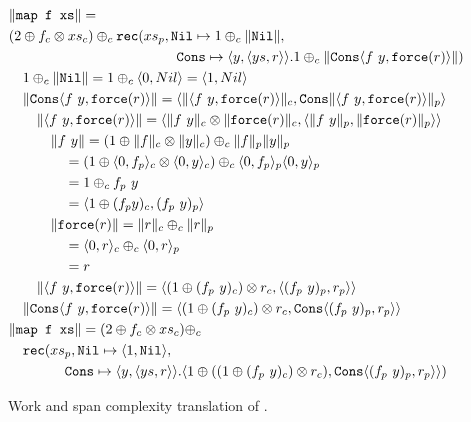 \begin{figure}
  \label{fig:ws_map_complexity_translation}
  \caption{Work and span complexity translation of .}
  \[\begin{split}
    &\|\texttt{map f xs}\| = \\
    &  (2 \oplus f_c \otimes xs_c) \oplus_c \texttt{rec}(xs_p, \texttt{Nil}\mapsto 1 \oplus_c \|\texttt{Nil}\|, \\
    &\qquad\quad\quad\quad\qquad\quad\quad\quad\qquad \texttt{Cons} \mapsto \langle y, \langle ys, r \rangle \rangle. 1 \oplus_c \|\texttt{Cons}\langle f\ y, \texttt{force}(r)\rangle \|) \\
    &\quad 1 \oplus_c \|\texttt{Nil}\| = 1 \oplus_c \langle 0, Nil \rangle = \langle 1, Nil \rangle \\
    &\quad\|\texttt{Cons}\langle f\ y, \texttt{force}(r)\rangle \| = \langle \|\langle f\ y, \texttt{force}(r)\rangle\|_c, \texttt{Cons} \| \langle f\ y, \texttt{force}(r)\rangle \|_p\rangle \\
    &\qquad \|\langle f\ y, \texttt{force}(r)\rangle\| = \langle \|f\ y\|_c \otimes \|\texttt{force}(r)\|_c, \langle \|f\ y\|_p, \|\texttt{force}(r)\|_p\rangle\rangle \\
    &\qquad\quad \|f\ y\| = (1 \oplus \|f\|_c \otimes \|y\|_c) \oplus_c \|f\|_p \|y\|_p \\
    &\qquad\quad\quad = (1 \oplus \langle 0, f_p \rangle_c \otimes \langle 0, y \rangle_c) \oplus_c \langle 0, f_p \rangle_p \langle 0, y \rangle_p \\
    &\qquad\quad\quad = 1 \oplus_c f_p\ y \\
    &\qquad\quad\quad = \langle 1 \oplus (f_p y)_c, (f_p\ y)_p \rangle \\
    &\qquad\quad \|\texttt{force}(r)\| = \|r\|_c \oplus_c \|r\|_p \\
    &\qquad\quad\quad = \langle 0, r \rangle_c \oplus_c \langle 0, r \rangle_p \\
    &\qquad\quad\quad = r \\
    &\qquad \|\langle f\ y, \texttt{force}(r)\rangle\| = \langle (1 \oplus (f_p\ y)_c) \otimes r_c, \langle (f_p\ y)_p, r_p \rangle \rangle \\
    &\quad\|\texttt{Cons}\langle f\ y, \texttt{force}(r)\rangle \| = \langle (1 \oplus (f_p\ y)_c) \otimes r_c, \texttt{Cons} \langle (f_p\ y)_p, r_p \rangle \rangle \\
    &\|\texttt{map f xs}\| = (2 \oplus f_c \otimes xs_c) \oplus_c \\
    &\quad \texttt{rec}(xs_p, \texttt{Nil}\mapsto \langle 1, \texttt{Nil}\rangle, \\
    &\qquad\quad\quad \texttt{Cons} \mapsto \langle y, \langle ys, r \rangle \rangle. \langle 1 \oplus ((1 \oplus (f_p\ y)_c) \otimes r_c), \texttt{Cons} \langle (f_p\ y)_p, r_p \rangle \rangle)
  \end{split}\]
\end{figure}
